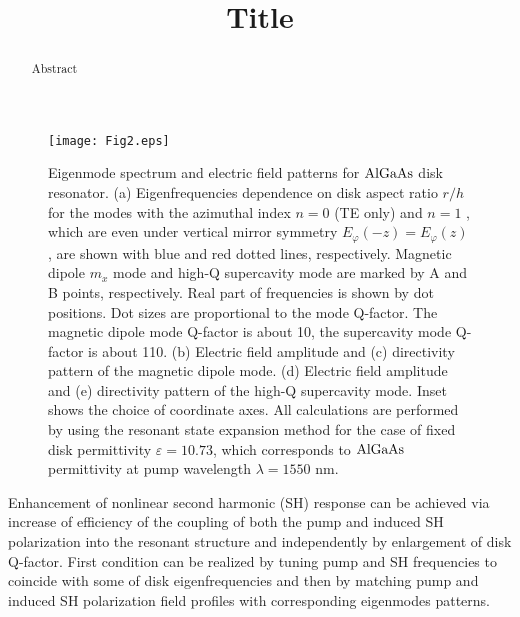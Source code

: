 \documentclass[prl,notitlepage,twocolumn]{revtex4}
\begin{document}





\title{Title}



\begin{abstract}
Abstract
\end{abstract}




\maketitle



\begin{figure*}[t]
   \centering
   \texttt{[image: Fig2.eps]} %
   \caption{ Eigenmode spectrum and electric field patterns for ${\rm AlGaAs}$ disk resonator. (a) Eigenfrequencies dependence on disk aspect ratio $r/h$ for the modes with the azimuthal index $n = 0$ (TE only) and $n = 1$ , which are even under vertical mirror symmetry $E_{\varphi}(-z) = E_{\varphi}(z)$, are shown with blue and red dotted lines, respectively. Magnetic dipole $m_x$ mode and high-Q supercavity mode are marked by A and B points, respectively. Real part of frequencies is shown by dot positions. Dot sizes are proportional to the mode Q-factor. The magnetic dipole mode Q-factor is about 10, the supercavity mode Q-factor is about 110.  (b) Electric field amplitude and (c) directivity pattern of the magnetic dipole mode. (d) Electric field amplitude and (e) directivity pattern of the high-Q supercavity mode. Inset shows the choice of coordinate axes. All calculations are performed by using the resonant state expansion method for the case of fixed disk permittivity $\varepsilon = 10.73$, which corresponds to ${\rm AlGaAs}$ permittivity at pump wavelength $\lambda =1550$ nm.}
   \label{fig:figure_2}
\end{figure*}

Enhancement of nonlinear second harmonic (SH) response can be achieved via increase of efficiency of the coupling of both the pump and induced SH polarization into the resonant structure and independently by enlargement of disk Q-factor. First condition can be realized by tuning pump and SH frequencies to coincide with some of disk eigenfrequencies and then by matching pump and induced SH polarization field profiles with corresponding eigenmodes patterns. 
\end{document}
